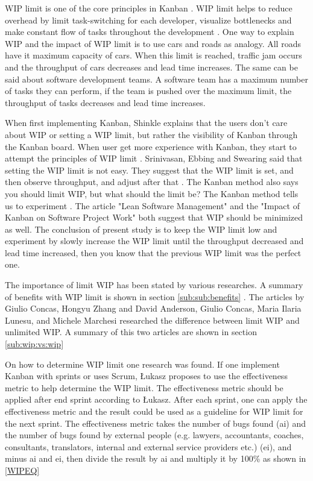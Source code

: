\documentclass[UKenglish]{ifimaster}  %
\begin{document}
WIP limit is one of the core principles in Kanban \parencite{6068363}. WIP limit helps to reduce overhead by limit task-switching for each developer, visualize bottlenecks and make constant flow of tasks throughout the development \parencite{DavidAnderson}. One way to explain WIP and the impact of WIP limit is to use cars and roads as analogy. All roads have it maximum capacity of cars. When this limit is reached, traffic jam occurs and the throughput of cars decreases and lead time increases. The same can be said about software development teams. A software team has a maximum number of tasks they can perform, if the team is pushed over the maximum limit, the throughput of tasks decreases and lead time increases.

When first implementing Kanban, Shinkle explains that the users don't care about WIP or setting a WIP limit, but rather the visibility of Kanban through the Kanban board. When user get more experience with Kanban, they start to attempt the principles of WIP limit \parencite{Shinkle}. Srinivasan, Ebbing and Swearing said that setting the WIP limit is not easy. They suggest that the WIP limit is set, and then observe throughput, and adjust after that \parencite{Mandyam}. The Kanban method also says you should limit WIP, but what should the limit be? The Kanban method tells us to experiment \parencite{Kniberg}. The article "Lean Software Management" \parencite{Kniberg} and the "Impact of Kanban on Software Project Work" \parencite{Ikonen} both suggest that WIP should be minimized as well. The conclusion of present study is to keep the WIP limit low and experiment by slowly increase the WIP limit until the throughput decreased and lead time increased, then you know that the previous WIP limit was the perfect one.

The importance of limit WIP has been stated by various researches. A summary of benefits with WIP limit is shown in section \ref{sub:sub:benefits} .  The articles by Giulio Concas, Hongyu Zhang \parencite{SMR:SMR1599}  and David Anderson, Giulio Concas, Maria Ilaria Lunesu, and Michele Marchesi \parencite{DavidAnderson} researched the difference between limit WIP and unlimited WIP.  A summary of this two articles are shown in section \ref{sub:wip:vs:wip}

On how to determine WIP limit one research was found. If one implement Kanban with sprints or uses Scrum, \L ukasz proposes to use the effectiveness metric to help determine the WIP limit. The effectiveness metric should be applied after end sprint according to \L ukasz. After each sprint, one can apply the effectiveness metric and the result could be used as a guideline for WIP limit for the next sprint. The effectiveness metric takes the number of bugs found (ai) and the number of bugs found by external people (e.g. lawyers, accountants, coaches, consultants, translators, internal and external service providers etc.) (ei), and minus ai and ei, then divide the result by ai and multiply it by 100\%  as shown in \ref{WIPEQ} \parencite{Sienkiewicz}
\end{document}
